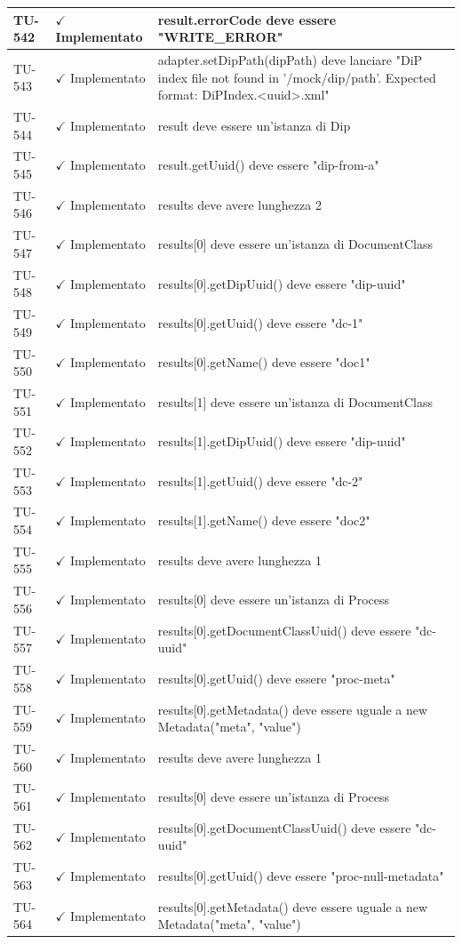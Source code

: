 ﻿\documentclass[a4paper,12pt]{article}
\newcommand{\ok}{\textcolor{green!60!black}{$\checkmark$ Implementato}}
\begin{document}
\begin{longtable}{|p{2cm}|p{3.5cm}|p{9.5cm}|}
\hline
TU-542 & \ok & result.errorCode deve essere "WRITE\_ERROR" \\
\hline
TU-543 & \ok & adapter.setDipPath(dipPath) deve lanciare "DiP index file not found in '/mock/dip/path'. Expected format: DiPIndex.<uuid>.xml" \\
\hline
TU-544 & \ok & result deve essere un'istanza di Dip \\
\hline
TU-545 & \ok & result.getUuid() deve essere "dip-from-a" \\
\hline
TU-546 & \ok & results deve avere lunghezza 2 \\
\hline
TU-547 & \ok & results[0] deve essere un'istanza di DocumentClass \\
\hline
TU-548 & \ok & results[0].getDipUuid() deve essere "dip-uuid" \\
\hline
TU-549 & \ok & results[0].getUuid() deve essere "dc-1" \\
\hline
TU-550 & \ok & results[0].getName() deve essere "doc1" \\
\hline
TU-551 & \ok & results[1] deve essere un'istanza di DocumentClass \\
\hline
TU-552 & \ok & results[1].getDipUuid() deve essere "dip-uuid" \\
\hline
TU-553 & \ok & results[1].getUuid() deve essere "dc-2" \\
\hline
TU-554 & \ok & results[1].getName() deve essere "doc2" \\
\hline
TU-555 & \ok & results deve avere lunghezza 1 \\
\hline
TU-556 & \ok & results[0] deve essere un'istanza di Process \\
\hline
TU-557 & \ok & results[0].getDocumentClassUuid() deve essere "dc-uuid" \\
\hline
TU-558 & \ok & results[0].getUuid() deve essere "proc-meta" \\
\hline
TU-559 & \ok & results[0].getMetadata() deve essere uguale a new Metadata("meta", "value") \\
\hline
TU-560 & \ok & results deve avere lunghezza 1 \\
\hline
TU-561 & \ok & results[0] deve essere un'istanza di Process \\
\hline
TU-562 & \ok & results[0].getDocumentClassUuid() deve essere "dc-uuid" \\
\hline
TU-563 & \ok & results[0].getUuid() deve essere "proc-null-metadata" \\
\hline
TU-564 & \ok & results[0].getMetadata() deve essere uguale a new Metadata("meta", "value") \\

\end{longtable}
\end{document}
